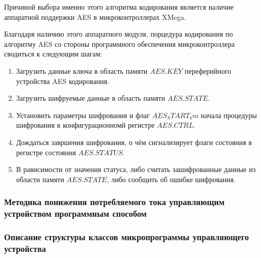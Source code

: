 Причиной выбора именно этого алгоритма кодирования является
наличие аппаратной поддержки AES в микроконтроллерах XMega.


Благодаря наличию этого аппаратного модуля, порцедура кодирования
по алгоритму AES со стороны программного обеспечения микроконтроллера
сводиться к следующим шагам:
\begin{enumerate}
    \item{} Загрузить данные ключа в область памяти $AES.KEY$
        переферийного устройства AES кодирования.
    \item{} Загрузить шифруемые данные в область памяти $AES.STATE$.
    \item{} Установить параметры шифрования и флаг $AES_START_bm$ начала
        процедуры шифрования в конфигурационномй регистре $AES.CTRL$.
    \item{} Дождаться завршения шифрования, о чём сигнализирует
        флаги состояния в регистре состояния $AES.STATUS$.
    \item{} В рависимости от значения статуса, либо считать зашифрованные
        данные из области памяти $AES.STATE$, либо сообщить об ошибке
        шифрования.
\end{enumerate}


\subsubsection{Методика понижения потребляемого тока управляющим устройством
программным способом}

\subsubsection{Описание структуры классов микропрограммы управляющего устройства}

